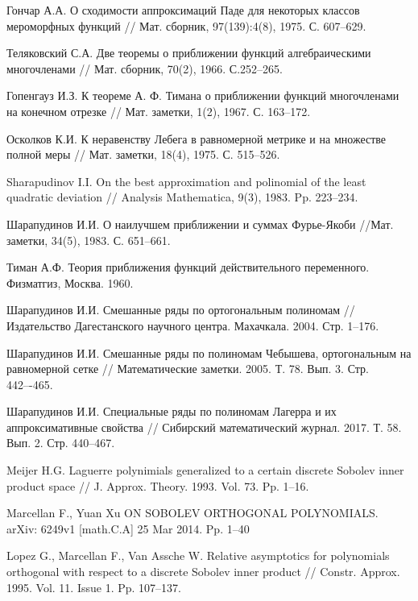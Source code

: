 \begin{thebibliography}{111}
{Гончар А.А.}
 О сходимости аппроксимаций Паде для некоторых классов мероморфных функций
// Мат. сборник, 97(139):4(8), 1975. С. 607--629.


{Теляковский С.А.}
 Две теоремы о приближении функций алгебраическими многочленами
// Мат. сборник, 70(2), 1966. С.252--265.


{Гопенгауз И.З.}
 К теореме А. Ф. Тимана о приближении функций многочленами на конечном отрезке
// Мат. заметки, 1(2), 1967. С. 163--172.


{Осколков К.И.}
 К неравенству Лебега в равномерной метрике и на множестве полной меры
// Мат.  заметки, 18(4), 1975. С. 515--526.


{Sharapudinov I.I.}
 On the best approximation and polinomial of the least quadratic deviation
// Analysis Mathematica, 9(3), 1983. Pp. 223--234.


{Шарапудинов И.И.}
 О наилучшем приближении и суммах Фурье-Якоби
//Мат. заметки, 34(5), 1983. С. 651--661.


{Тиман А.Ф.} Теория приближения функций действительного переменного. Физматгиз, Москва. 1960.


{Шарапудинов И.И.}
Смешанные ряды по ортогональным полиномам // Издательство Дагестанского научного центра. Махачкала. 2004. Стр. 1--176.


{Шарапудинов И.И.}
Смешанные ряды по полиномам Чебышева, ортогональным на равномерной сетке // Математические заметки. 2005. Т. 78. Вып. 3. Стр. 442–-465.


{Шарапудинов И.И.}
Специальные ряды по полиномам Лагерра и их аппроксимативные свойства // Сибирский математический журнал. 2017. Т. 58. Вып. 2. Стр. 440--467.


{Meijer H.G.}
Laguerre polynimials generalized to a certain discrete Sobolev inner product space // J. Approx. Theory. 1993. Vol. 73. Pp. 1--16.


{Marcellan F., Yuan Xu}
ON SOBOLEV ORTHOGONAL POLYNOMIALS. arXiv: 6249v1 [math.C.A] 25 Mar 2014. Pp. 1--40


{Lopez G., Marcellan F., Van Assche W.}
Relative asymptotics for polynomials orthogonal with respect to a discrete Sobolev inner product // Constr. Approx. 1995. Vol. 11. Issue 1. Pp. 107--137.



\end{thebibliography}
